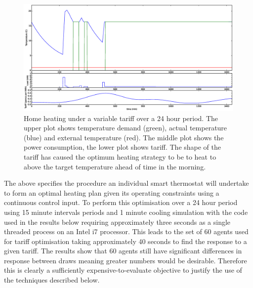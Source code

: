 \documentclass[a4paper, 10 pt, conference]{ieeeconf}  %
\begin{document}
\begin{figure}[htb]

\centering
\includegraphics[width=\textwidth,trim =4cm 8cm 4cm 2cm,clip=True]{f4.eps}
\caption{Home heating under a variable tariff over a 24 hour period. The upper plot shows temperature demand (green), actual temperature (blue) and external temperature (red). The middle plot shows the power consumption, the lower plot shows tariff. The shape of the tariff has caused the optimum  heating strategy to be to heat to above the target temperature ahead of time in the morning.}
\label{quadtemp}
\end{figure}

The above specifies the procedure an individual smart thermostat will undertake to form an optimal heating plan given its operating constraints using a continuous control input. To perform this optimisation over a 24 hour period using 15 minute intervals periods and 1 minute cooling simulation with the code used in the results below requiring approximately three seconds as a single threaded process on an Intel i7 processor. This leads to the set of 60 agents used for tariff optimisation taking approximately 40 seconds to find the response to a given tariff. The results show that 60 agents still have significant differences in response between draws meaning greater numbers would be desirable. Therefore this is clearly a sufficiently expensive-to-evaluate objective to justify the use of the techniques described below. 
\end{document}
